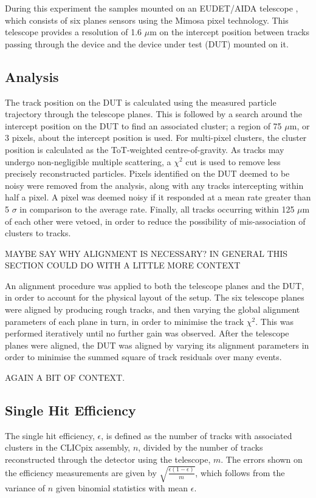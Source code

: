 During this experiment the samples mounted on an EUDET/AIDA telescope \cite{Rubinskiy:2000287}, which consists of six planes sensors using the Mimosa pixel technology.  This telescope provides a resolution of 1.6 $\mu$m on the intercept position between tracks passing through the device and the device under test (DUT) mounted on it.  


\subsection{Analysis}
The track position on the DUT is calculated using the measured particle trajectory through the telescope planes.  This is followed by a search around the intercept position on the DUT to find an associated cluster; a region of 75 $\mu$m, or 3 pixels, about the intercept position is used.  For multi-pixel clusters, the cluster position is calculated as the ToT-weighted centre-of-gravity.  As tracks may undergo non-negligible multiple scattering, a $\chi^{2}$ cut is used to remove less precisely reconstructed particles. Pixels identified on the DUT deemed to be noisy were removed from the analysis, along with any tracks intercepting within half a pixel.  A pixel was deemed noisy if it responded at a mean rate greater than 5 $\sigma$ in comparison to the average rate.  Finally, all tracks occurring within 125 $\mu$m of each other were vetoed, in order to reduce the possibility of mis-association of clusters to tracks. 

MAYBE SAY WHY ALIGNMENT IS NECESSARY? IN GENERAL THIS SECTION COULD DO WITH A LITTLE MORE CONTEXT

An alignment procedure was applied to both the telescope planes and the DUT, in order to account for the physical layout of the setup.  The six telescope planes were aligned by producing rough tracks, and then varying the global alignment parameters of each plane in turn, in order to minimise the track $\chi^{2}$. This was performed iteratively until no further gain was observed. After the telescope planes were aligned, the DUT was aligned by varying its alignment parameters in order to minimise the summed square of track residuals over many events.


AGAIN A BIT OF CONTEXT.

\subsection{Single Hit Efficiency}
The single hit efficiency, $\epsilon$, is defined as the number of tracks with associated clusters in the CLICpix assembly, $n$, divided by the number of tracks reconstructed through the detector using the telescope, $m$. The errors shown on the efficiency measurements are given by $\sqrt{\frac{\epsilon (1 - \epsilon)}{m}}$, which follows from the variance of $n$ given binomial statistics with mean $\epsilon$.  

